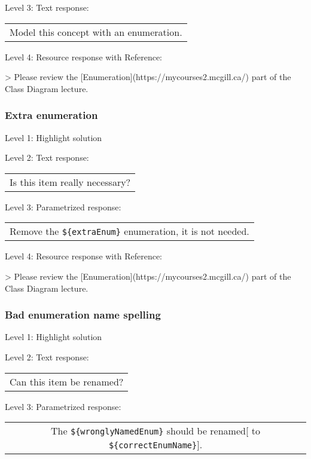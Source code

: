\noindent Level 3: Text response: \medskip

\begin{tabular}{|c}
Model this concept with an enumeration.
\end{tabular} \medskip

\noindent Level 4: Resource response with Reference:

> Please review the [Enumeration](https://mycourses2.mcgill.ca/) part of the Class Diagram lecture.


\subsubsection{Extra enumeration}

\noindent Level 1: Highlight solution \medskip

\noindent Level 2: Text response: \medskip

\begin{tabular}{|c}
Is this item really necessary?
\end{tabular} \medskip

\noindent Level 3: Parametrized response: \medskip

\begin{tabular}{|c}
Remove the \verb|${extraEnum}| enumeration, it is not needed.
\end{tabular} \medskip

\noindent Level 4: Resource response with Reference:

> Please review the [Enumeration](https://mycourses2.mcgill.ca/) part of the Class Diagram lecture.


\subsubsection{Bad enumeration name spelling}

\noindent Level 1: Highlight solution \medskip

\noindent Level 2: Text response: \medskip

\begin{tabular}{|c}
Can this item be renamed?
\end{tabular} \medskip

\noindent Level 3: Parametrized response: \medskip

\begin{tabular}{|c}
The \verb|${wronglyNamedEnum}| should be renamed[ to \verb|${correctEnumName}|].
\end{tabular} \medskip

